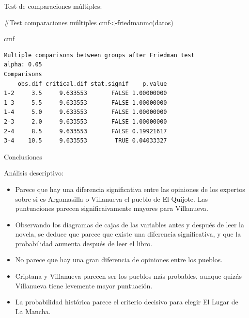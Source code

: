\documentclass[
  ignorenonframetext,
]{beamer}
\newenvironment{Shaded}{\begin{snugshade}}{\end{snugshade}}
\newcommand{\CommentTok}[1]{\textcolor[rgb]{0.37,0.37,0.37}{#1}}
\newcommand{\ConstantTok}[1]{\textcolor[rgb]{0.56,0.35,0.01}{#1}}
\newcommand{\FunctionTok}[1]{\textcolor[rgb]{0.28,0.35,0.67}{#1}}
\newcommand{\NormalTok}[1]{\textcolor[rgb]{0.00,0.23,0.31}{#1}}
\newcommand{\OtherTok}[1]{\textcolor[rgb]{0.00,0.23,0.31}{#1}}
\newcommand{\SpecialCharTok}[1]{\textcolor[rgb]{0.37,0.37,0.37}{#1}}
\newcommand{\StringTok}[1]{\textcolor[rgb]{0.13,0.47,0.30}{#1}}
\begin{document}
\begin{frame}[fragile]
\begin{block}{Test de comparaciones múltiples:}
\label{test-de-comparaciones-muxfaltiples-1}
\begin{Shaded}
\begin{Highlighting}[]
\CommentTok{\#Test comparaciones múltiples}
\NormalTok{cmf}\OtherTok{\textless{}{-}}\FunctionTok{friedmanmc}\NormalTok{(datos) }

\NormalTok{cmf}
\end{Highlighting}
\end{Shaded}

\begin{verbatim}
Multiple comparisons between groups after Friedman test 
alpha: 0.05 
Comparisons
    obs.dif critical.dif stat.signif    p.value
1-2     3.5     9.633553       FALSE 1.00000000
1-3     5.5     9.633553       FALSE 1.00000000
1-4     5.0     9.633553       FALSE 1.00000000
2-3     2.0     9.633553       FALSE 1.00000000
2-4     8.5     9.633553       FALSE 0.19921617
3-4    10.5     9.633553        TRUE 0.04033327
\end{verbatim}

\begin{Shaded}
\end{Shaded}
\end{block}
\end{frame}

\begin{frame}{Conclusiones}
\label{conclusiones}
\begin{block}{Análisis descriptivo:}
\label{anuxe1lisis-descriptivo-1}
\begin{itemize}
\item
  Parece que hay una diferencia significativa entre las opiniones de los
  expertos sobre si es Argamasilla o Villanueva el pueblo de El Quijote.
  Las puntuaciones parecen significaivamente mayores para Villanueva.
\item
  Observando los diagramas de cajas de las variables antes y después de
  leer la novela, se deduce que parece que existe una diferencia
  significativa, y que la probabilidad aumenta después de leer el libro.
\item
  No parece que hay una gran diferencia de opiniones entre los pueblos.
\item
  Criptana y Villanueva parecen ser los pueblos más probables, aunque
  quizás Villanueva tiene levemente mayor puntuación.
\item
  La probabilidad histórica parece el criterio decisivo para elegir El
  Lugar de La Mancha.
\end{itemize}
\end{block}
\end{frame}
\end{document}

